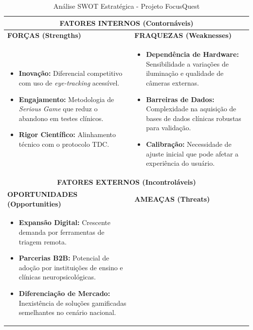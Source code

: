 \documentclass[11pt,a4paper]{article}
\begin{document}
\begin{table}[H]
\centering
\caption{Análise SWOT Estratégica - Projeto FocusQuest}
\label{tab:swot}
\small
\begin{tabular}{|p{7.2cm}|p{7.2cm}|}
\hline
\multicolumn{2}{|c|}{\cellcolor{gray!20}\textbf{FATORES INTERNOS (Contornáveis)}} \\
\hline
\textbf{FORÇAS (Strengths)} & \textbf{FRAQUEZAS (Weaknesses)} \\
\hline
\begin{minipage}[t]{7cm}
\begin{itemize}[leftmargin=*]
    \item \textbf{Inovação:} Diferencial competitivo com uso de \textit{eye-tracking} acessível.
    \item \textbf{Engajamento:} Metodologia de \textit{Serious Game} que reduz o abandono em testes clínicos.
    \item \textbf{Rigor Científico:} Alinhamento técnico com o protocolo TDC.
\end{itemize}
\end{minipage}
&
\begin{minipage}[t]{7cm}
\begin{itemize}[leftmargin=*]
    \item \textbf{Dependência de Hardware:} Sensibilidade a variações de iluminação e qualidade de câmeras externas.
    \item \textbf{Barreiras de Dados:} Complexidade na aquisição de bases de dados clínicas robustas para validação.
    \item \textbf{Calibração:} Necessidade de ajuste inicial que pode afetar a experiência do usuário.
\end{itemize}
\end{minipage}
\\
\hline
\multicolumn{2}{|c|}{\cellcolor{gray!20}\textbf{FATORES EXTERNOS (Incontroláveis)}} \\
\hline
\textbf{OPORTUNIDADES (Opportunities)} & \textbf{AMEAÇAS (Threats)} \\
\hline
\begin{minipage}[t]{7cm}
\begin{itemize}[leftmargin=*]
    \item \textbf{Expansão Digital:} Crescente demanda por ferramentas de triagem remota.
    \item \textbf{Parcerias B2B:} Potencial de adoção por instituições de ensino e clínicas neuropsicológicas.
    \item \textbf{Diferenciação de Mercado:} Inexistência de soluções gamificadas semelhantes no cenário nacional.

\end{itemize}
\end{minipage}
\end{tabular}
\end{table}
\end{document}
